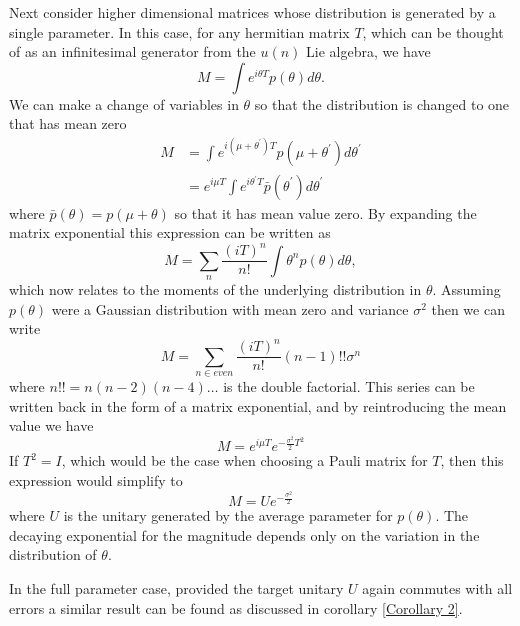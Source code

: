 \documentclass[aps,pra,twocolumn,superscriptaddress,numerical,floatfix]{revtex4-1}
\begin{document}
Next consider higher dimensional matrices whose distribution is generated by a single parameter.  In this case, for any hermitian matrix $T$, which can be thought of as an infinitesimal generator from the $u(n)$ Lie algebra, we have
\begin{equation}
	M=\int e^{i\theta T}p(\theta)d\theta 
	\label{eq:single parameter, multi-mode}.
\end{equation}
We can make a change of variables in $\theta$ so that the distribution is changed to one that has mean zero
\begin{align}
	M&=\int e^{i(\mu + \theta^\prime)T} p(\mu + \theta^\prime) d\theta^\prime\\
	&= e^{i\mu T} \int e^{i\theta^\prime T} \bar{p}(\theta^\prime) d\theta^\prime \label{eq:seperating errors and transformations}
\end{align}
where $\bar{p}(\theta) = p(\mu + \theta)$ so that it has mean value zero.  By expanding the matrix exponential this expression can be written as
\begin{equation}
	M=\sum_n \frac{(iT)^n}{n!} \int \theta^n p(\theta) d\theta,
\end{equation}
which now relates to the moments of the underlying distribution in $\theta$. Assuming $p(\theta)$ were a Gaussian distribution with mean zero and variance $\sigma^2$ then we can write
\begin{equation}
	M = \sum_{n \in even} \frac{(iT)^n}{n!} (n-1)!! \sigma^n
\end{equation}
where $n!! = n(n-2)(n-4)\dots$ is the double factorial.  This series can be written back in the form of a matrix exponential, and by reintroducing the mean value we have
\begin{equation}
	M = e^{i\mu T} e^{-\frac{\sigma^2}{2} T^2}
\end{equation}
If $T^2=I$, which would be the case when choosing a Pauli matrix for $T$, then this expression would simplify to
\begin{equation}
M=Ue^{-\frac{\sigma^2}{2}}  \label{eq:Gaussian Psuccess}
\end{equation}
where $U$ is the unitary generated by the average parameter for $p(\theta)$.  The decaying exponential for the magnitude depends only on the variation in the distribution of $\theta$.

In the full parameter case, provided the target unitary $U$ again commutes with all errors a similar result can be found as discussed in corollary \ref{Corollary 2}.
\end{document}
